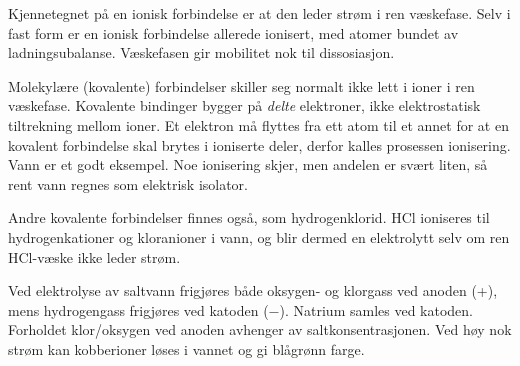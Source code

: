 \vskip 10pt

Kjennetegnet på en ionisk forbindelse er at den leder strøm i ren væskefase. Selv i fast form er en ionisk forbindelse allerede ionisert, med atomer bundet av ladningsubalanse. Væskefasen gir mobilitet nok til dissosiasjon.

\vskip 10pt

Molekylære (kovalente) forbindelser skiller seg normalt ikke lett i ioner i ren væskefase. Kovalente bindinger bygger på {\it delte} elektroner, ikke elektrostatisk tiltrekning mellom ioner. Et elektron må flyttes fra ett atom til et annet for at en kovalent forbindelse skal brytes i ioniserte deler, derfor kalles prosessen ionisering. Vann er et godt eksempel. Noe ionisering skjer, men andelen er svært liten, så rent vann regnes som elektrisk isolator.

Andre kovalente forbindelser finnes også, som hydrogenklorid. HCl ioniseres til hydrogenkationer og kloranioner i vann, og blir dermed en elektrolytt selv om ren HCl-væske ikke leder strøm.

\vskip 10pt

Ved elektrolyse av saltvann frigjøres både oksygen- og klorgass ved anoden (+), mens hydrogengass frigjøres ved katoden ($-$). Natrium samles ved katoden. Forholdet klor/oksygen ved anoden avhenger av saltkonsentrasjonen. Ved høy nok strøm kan kobberioner løses i vannet og gi blågrønn farge.










